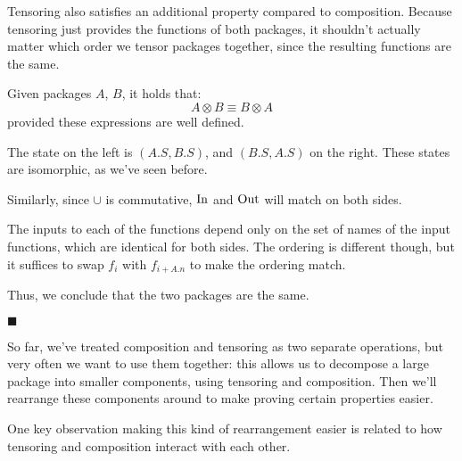 Tensoring also satisfies an additional property compared to composition.
Because tensoring just provides the functions of both packages,
it shouldn't actually matter which order we tensor packages together,
since the resulting functions are the same.

\begin{lemma}
    Given packages $A$, $B$, it holds that:
    $$
    A \otimes B \equiv B \otimes A
    $$
    provided these expressions are well defined.

     The state on the left is $(A.S, B.S)$, and $(B.S, A.S)$
    on the right.
    These states are isomorphic, as we've seen before.

    Similarly, since $\cup$ is commutative, $\text{In}$ and $\text{Out}$
    will match on both sides.

    The inputs to each of the functions depend only on the set
    of names of the input functions, which are identical for both sides.
    The ordering is different though, but it suffices
    to swap $f_i$ with $f_{i + A.n}$ to make the ordering match.

    Thus, we conclude that the two packages are the same.

    $\blacksquare$
\end{lemma}

So far, we've treated composition and tensoring as two separate operations,
but very often we want to use them together:
this allows us to decompose a large package
into smaller components, using tensoring and composition.
Then we'll rearrange these components around to make proving
certain properties easier.

One key observation making this kind of rearrangement easier
is related to how tensoring and composition interact with each other.

